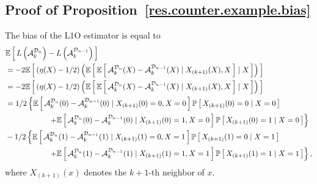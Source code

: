 \documentclass[twoside,11pt]{article}
\numberwithin{equation}{section}
\newcommand{\1}{\mathds{1}}%
\newcommand{\paren}[1]{\left( #1 \right)}
\newcommand{\croch}[1]{\left[\, #1 \,\right]}
\newcommand{\E}{\mathbb{E}}
\renewcommand{\P}{\mathbb{P}}
\newcommand{\D}{\mathcal{D}}
\newcommand{\Dn}{\mathcal{D}_n}
\newcommand{\A}{\mathcal{A}}
\numberwithin{equation}{section}
\theoremstyle{plain}
\begin{document}
\subsection{Proof of Proposition~\ref{res.counter.example.bias}}
\label{sec.proof.couter.example}
%
%

	The bias of the L1O estimator is equal to
	\begin{align*}
	& \E\croch{ L\paren{\A_k^{\Dn}} - L\paren{\A_k^{\D_{n-1}}}  } \\
	& = -2 \E\croch{ \paren{\eta(X)-1/2} \paren{ \E\croch{ \E\croch{ \A_k^{\Dn}(X) - \A_k^{\D_{n-1}}(X) \mid X_{(k+1)}(X), X} \mid X } } } \\
	& = -2 \E\croch{ \paren{\eta(X)-1/2} \paren{ \E\croch{ \E\croch{ \A_k^{\Dn}(X) - \A_k^{\D_{n-1}}(X) \mid X_{(k+1)}(X), X} \mid X } } } \\
	& = 1/2 \left\lbrace  \E\croch{ \A_k^{\Dn}(0) - \A_k^{\D_{n-1}}(0) \mid X_{(k+1)}(0)=0, X=0}\P\croch{ X_{(k+1)}(0)=0\mid X=0} \right.\\
	&\left.\hspace*{2cm}+ \E\croch{ \A_k^{\Dn}(0) - \A_k^{\D_{n-1}}(0) \mid X_{(k+1)}(0)=1, X=0}\P\croch{ X_{(k+1)}(0)=1\mid X=0}  \right\rbrace \\
	& -   1/2 \left\lbrace  \E\croch{ \A_k^{\Dn}(1) - \A_k^{\D_{n-1}}(1) \mid X_{(k+1)}(1)=0, X=1}\P\croch{ X_{(k+1)}(1)=0\mid X=1} \right.\\
	& \left. \hspace*{2cm}+ \E\croch{ \A_k^{\Dn}(1) - \A_k^{\D_{n-1}}(1) \mid X_{(k+1)}(1)=1, X=1}\P\croch{ X_{(k+1)}(1)=1\mid X=1}  \right\rbrace ,
	\end{align*}
	where $X_{(k+1)}(x)$ denotes the $k+1$-th neighbor of $x$.
\end{document}
